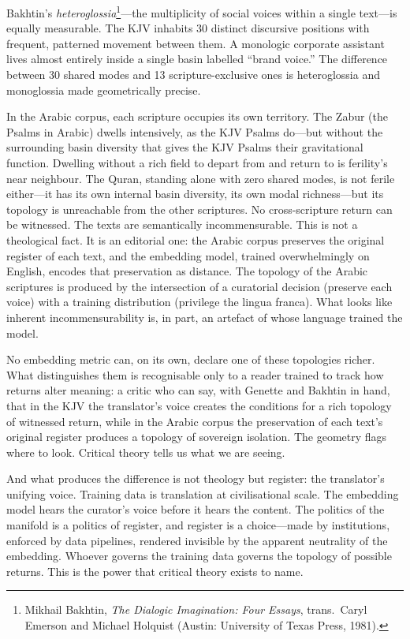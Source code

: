 Bakhtin's \emph{heteroglossia}\footnote{Mikhail Bakhtin, \emph{The Dialogic Imagination: Four Essays}, trans.\ Caryl Emerson and Michael Holquist (Austin: University of Texas Press, 1981).}---the multiplicity of social voices within a single text---is equally measurable. The KJV inhabits 30 distinct discursive positions with frequent, patterned movement between them. A monologic corporate assistant lives almost entirely inside a single basin labelled ``brand voice.'' The difference between 30 shared modes and 13 scripture-exclusive ones is heteroglossia and monoglossia made geometrically precise.

In the Arabic corpus, each scripture occupies its own territory. The Zabur (the Psalms in Arabic) dwells intensively, as the KJV Psalms do---but without the surrounding basin diversity that gives the KJV Psalms their gravitational function. Dwelling without a rich field to depart from and return to is ferility's near neighbour. The Quran, standing alone with zero shared modes, is not ferile either---it has its own internal basin diversity, its own modal richness---but its topology is unreachable from the other scriptures. No cross-scripture return can be witnessed. The texts are semantically incommensurable. This is not a theological fact. It is an editorial one: the Arabic corpus preserves the original register of each text, and the embedding model, trained overwhelmingly on English, encodes that preservation as distance. The topology of the Arabic scriptures is produced by the intersection of a curatorial decision (preserve each voice) with a training distribution (privilege the lingua franca). What looks like inherent incommensurability is, in part, an artefact of whose language trained the model.

No embedding metric can, on its own, declare one of these topologies richer. What distinguishes them is recognisable only to a reader trained to track how returns alter meaning: a critic who can say, with Genette and Bakhtin in hand, that in the KJV the translator's voice creates the conditions for a rich topology of witnessed return, while in the Arabic corpus the preservation of each text's original register produces a topology of sovereign isolation. The geometry flags where to look. Critical theory tells us what we are seeing.

And what produces the difference is not theology but register: the translator's unifying voice. Training data is translation at civilisational scale. The embedding model hears the curator's voice before it hears the content. The politics of the manifold is a politics of register, and register is a choice---made by institutions, enforced by data pipelines, rendered invisible by the apparent neutrality of the embedding. Whoever governs the training data governs the topology of possible returns. This is the power that critical theory exists to name.

